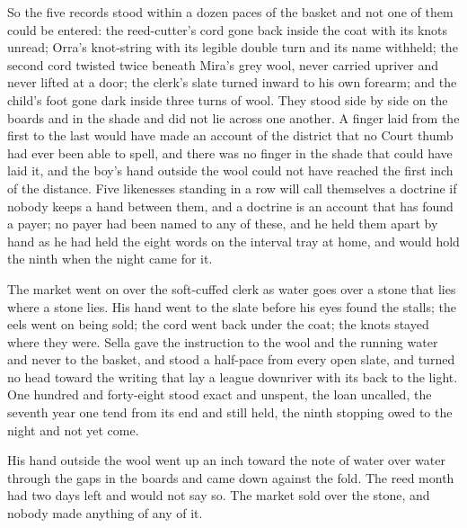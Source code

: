 So the five records stood within a dozen paces of the basket and not one of them could be entered: the reed-cutter's cord gone back inside the coat with its knots unread; Orra's knot-string with its legible double turn and its name withheld; the second cord twisted twice beneath Mira's grey wool, never carried upriver and never lifted at a door; the clerk's slate turned inward to his own forearm; and the child's foot gone dark inside three turns of wool. They stood side by side on the boards and in the shade and did not lie across one another. A finger laid from the first to the last would have made an account of the district that no Court thumb had ever been able to spell, and there was no finger in the shade that could have laid it, and the boy's hand outside the wool could not have reached the first inch of the distance. Five likenesses standing in a row will call themselves a doctrine if nobody keeps a hand between them, and a doctrine is an account that has found a payer; no payer had been named to any of these, and he held them apart by hand as he had held the eight words on the interval tray at home, and would hold the ninth when the night came for it.

The market went on over the soft-cuffed clerk as water goes over a stone that lies where a stone lies. His hand went to the slate before his eyes found the stalls; the eels went on being sold; the cord went back under the coat; the knots stayed where they were. Sella gave the instruction to the wool and the running water and never to the basket, and stood a half-pace from every open slate, and turned no head toward the writing that lay a league downriver with its back to the light. One hundred and forty-eight stood exact and unspent, the loan uncalled, the seventh year one tend from its end and still held, the ninth stopping owed to the night and not yet come.

His hand outside the wool went up an inch toward the note of water over water through the gaps in the boards and came down against the fold. The reed month had two days left and would not say so. The market sold over the stone, and nobody made anything of any of it.

